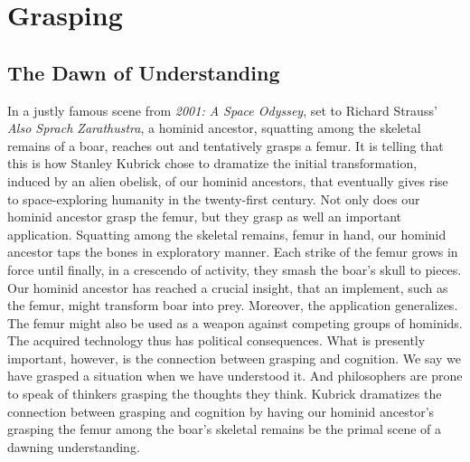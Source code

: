 
\chapter{Grasping} %
\label{cha:grasping}


\section{The Dawn of Understanding} %
\label{sec:grasping_and_the_dawn_of_understanding}

In a justly famous scene from \emph{2001: A Space Odyssey}, set to Richard Strauss' \emph{Also Sprach Zarathustra}, a hominid ancestor, squatting among the skeletal remains of a boar, reaches out and tentatively grasps a femur. It is telling that this is how Stanley Kubrick chose to dramatize the initial transformation, induced by an alien obelisk, of our hominid ancestors, that eventually gives rise to space-exploring humanity in the twenty-first century. Not only does our hominid ancestor grasp the femur, but they grasp as well an important application. Squatting among the skeletal remains, femur in hand, our hominid ancestor taps the bones in exploratory manner. Each strike of the femur grows in force until finally, in a crescendo of activity, they smash the boar's skull to pieces. Our hominid ancestor has reached a crucial insight, that an implement, such as the femur, might transform boar into prey. Moreover, the application generalizes. The femur might also be used as a weapon against competing groups of hominids. The acquired technology thus has political consequences. What is presently important, however, is the connection between grasping and cognition. We say we have grasped a situation when we have understood it. And philosophers are prone to speak of thinkers grasping the thoughts they think. Kubrick dramatizes the connection between grasping and cognition by having our hominid ancestor's grasping the femur among the boar's skeletal remains be the primal scene of a dawning understanding.

